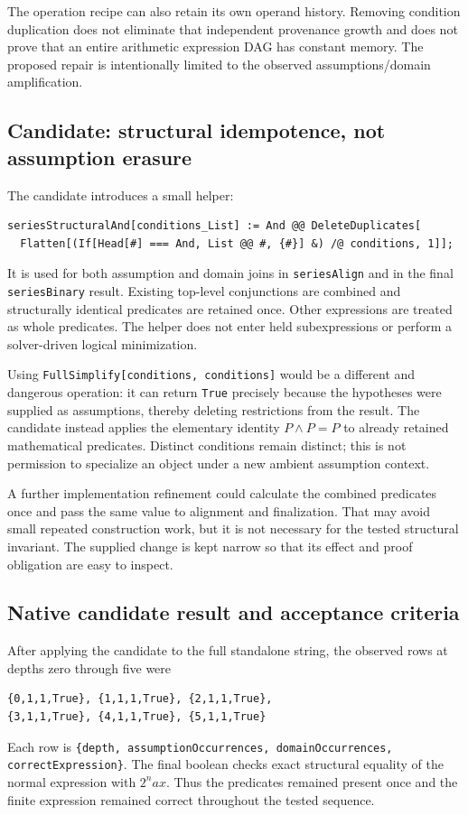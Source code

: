 \documentclass[11pt,a4paper]{article}
\begin{document}
The operation recipe can also retain its own operand history. Removing condition duplication does not eliminate that independent provenance growth and does not prove that an entire arithmetic expression DAG has constant memory. The proposed repair is intentionally limited to the observed assumptions/domain amplification.

\subsection{Candidate: structural idempotence, not assumption erasure}
The candidate introduces a small helper:
\begin{lstlisting}
seriesStructuralAnd[conditions_List] := And @@ DeleteDuplicates[
  Flatten[(If[Head[#] === And, List @@ #, {#}] &) /@ conditions, 1]];
\end{lstlisting}
It is used for both assumption and domain joins in \texttt{seriesAlign} and in the final \texttt{seriesBinary} result. Existing top-level conjunctions are combined and structurally identical predicates are retained once. Other expressions are treated as whole predicates. The helper does not enter held subexpressions or perform a solver-driven logical minimization.

Using \texttt{FullSimplify[conditions, conditions]} would be a different and dangerous operation: it can return \texttt{True} precisely because the hypotheses were supplied as assumptions, thereby deleting restrictions from the result. The candidate instead applies the elementary identity $P\wedge P=P$ to already retained mathematical predicates. Distinct conditions remain distinct; this is not permission to specialize an object under a new ambient assumption context.

A further implementation refinement could calculate the combined predicates once and pass the same value to alignment and finalization. That may avoid small repeated construction work, but it is not necessary for the tested structural invariant. The supplied change is kept narrow so that its effect and proof obligation are easy to inspect.

\subsection{Native candidate result and acceptance criteria}
After applying the candidate to the full standalone string, the observed rows at depths zero through five were
\begin{lstlisting}
{0,1,1,True}, {1,1,1,True}, {2,1,1,True},
{3,1,1,True}, {4,1,1,True}, {5,1,1,True}
\end{lstlisting}
Each row is \texttt{\{depth, assumptionOccurrences, domainOccurrences, correctExpression\}}. The final boolean checks exact structural equality of the normal expression with $2^n a x$. Thus the predicates remained present once and the finite expression remained correct throughout the tested sequence.
\end{document}
